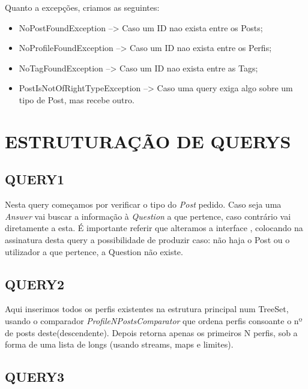 \documentclass[letterpaper, 10 pt, conference]{IEEEtran} %
\begin{document}
Quanto a excepções, criamos as seguintes:
\begin{itemize}
     \item NoPostFoundException --> Caso um ID nao exista entre os Posts;
     \item NoProfileFoundException --> Caso um ID nao exista entre os Perfis;
     \item NoTagFoundException --> Caso um ID nao exista entre as Tags;
     \item PostIsNotOfRightTypeException --> Caso uma query exiga algo sobre um tipo de Post, mas recebe outro.
\end{itemize}


\section{ESTRUTURAÇÃO DE QUERYS}

\subsection{QUERY1}

Nesta query começamos por verificar o tipo do \textit{Post} pedido. Caso seja uma \textit{Answer} vai buscar a informação
à \textit{Question} a que pertence, caso contrário vai diretamente a esta.
É importante referir que alteramos a interface , colocando na assinatura desta query a
possibilidade de produzir  caso: não haja o Post ou o utilizador a que pertence, a Question não existe.


\subsection{QUERY2}

Aqui inserimos todos os perfis existentes na estrutura principal num TreeSet, usando o comparador \textit{ProfileNPostsComparator}
que ordena perfis consoante o nº de posts deste(descendente). Depois retorna apenas os primeiros N
perfis, sob a forma de uma lista de longs (usando streams, maps e limites).

\subsection{QUERY3}
\end{document}
